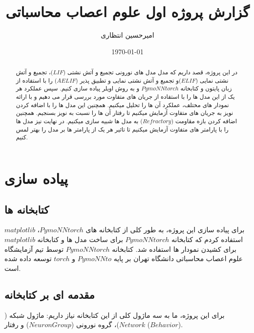 \documentclass{article}
\title{گزارش پروژه اول علوم اعصاب محاسباتی}
\author{امیرحسین انتظاری}
\date{\today}
\begin{document}
\maketitle
\newpage

    \begin{abstract}
        در این پروژه، قصد داریم که مدل مدل های نورونی تجمیع و آتش نشتی
        ($LIF$)، 
        تجمیع و آتش نشتی نمایی
        ($ELIF$)و 
        تجمیع و آتش نشتی نمایی و تطبیق پذیر
        ($AELIF$) 
        را با استفاده از زبان پایتون و کتابخانه 
        $PymoNNtorch$ 
        و به روش اویلر پیاده سازی کنیم. سپس عملکرد هر یک از این مدل ها را با استفاده از جریان های متفاوت مورد بررسی قرار می دهیم و با ارائه نمودار های مختلف، عملکرد آن ها را تحلیل میکنیم. همچنین این مدل ها را با اضافه کردن نویز به جریان های متفاوت آزمایش میکنیم تا رفتار آن ها را نسبت به نویز بسنجیم. همچنین اضافه کردن بازه مقاومت
        ($Refractory$)
        به مدل ها شبیه سازی میکنیم. در نهایت نیز مدل ها را با پارامتر های متفاوت آزمایش میکنیم تا تاثیر هر یک از پارامتر ها بر مدل را بهتر لمس کنیم.
    \end{abstract}

\newpage
    \section{پیاده سازی}
    \subsection{کتابخانه ها}
        برای پیاده سازی این پروژه، به طور کلی از کتابخانه های
        $PymoNNtorch$، 
        $matplotlib$ 
        استفاده کردم که کتابخانه 
        $PymoNNtorch$ 
        برای ساخت مدل ها و کتابخانه 
        $matplotlib$ 
        برای کشیدن نمودار ها استفاده شد.
        کتابخانه
        $PymoNNtorch$ 
        توسط تیم آزمایشگاه علوم اعصاب محاسباتی دانشگاه تهران بر پایه 
        $PymoNNto$ و
        $torch$ 
        توسعه داده شده است.

    \subsection{مقدمه ای بر کتابخانه }
        برای این پروژه، ما به سه ماژول کلی از این کتابخانه نیاز داریم: ماژول شبکه
        ($Network$)، 
        گروه نورونی
        ($NeuronGroup$) و
        رفتار 
        ($Behavior$).
\end{document}
